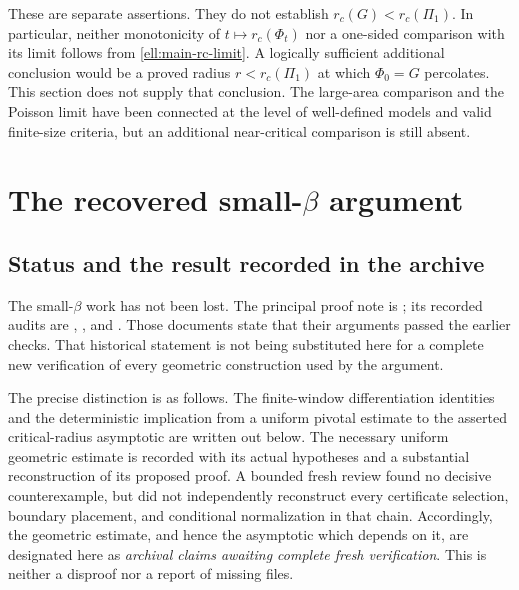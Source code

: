 \documentclass[11pt,a4paper]{article}
\theoremstyle{definition}
\theoremstyle{remark}
\numberwithin{equation}{section}
\begin{document}
These are separate assertions.  They do not establish
$r_c(G)<r_c(\Pi_1)$.  In particular, neither monotonicity of
$t\mapsto r_c(\Phi_t)$ nor a one-sided comparison with its
limit follows from \eqref{ell:main-rc-limit}.  A logically
sufficient additional conclusion would be a proved radius
$r<r_c(\Pi_1)$ at which $\Phi_0=G$ percolates.  This section
does not supply that conclusion.  The large-area comparison
and the Poisson limit have been connected at the level of
well-defined models and valid finite-size criteria, but an
additional near-critical comparison is still absent.


\section{The recovered small-\texorpdfstring{$\beta$}{beta} argument}
\label{sb:section}

\subsection{Status and the result recorded in the archive}

The small-$\beta$ work has not been lost. The principal proof note is
; its recorded
audits are ,
, and
. Those documents state that their
arguments passed the earlier checks. That historical statement is not
being substituted here for a complete new verification of every
geometric construction used by the argument.

The precise distinction is as follows. The finite-window differentiation
identities and the deterministic implication from a uniform pivotal
estimate to the asserted critical-radius asymptotic are written out
below. The necessary uniform geometric estimate is recorded with its
actual hypotheses and a substantial reconstruction of its proposed
proof. A bounded fresh review found no decisive counterexample, but did
not independently reconstruct every certificate selection, boundary
placement, and conditional normalization in that chain. Accordingly,
the geometric estimate, and hence the asymptotic which depends on it,
are designated here as \emph{archival claims awaiting complete fresh
verification}. This is neither a disproof nor a report of missing files.
\end{document}
